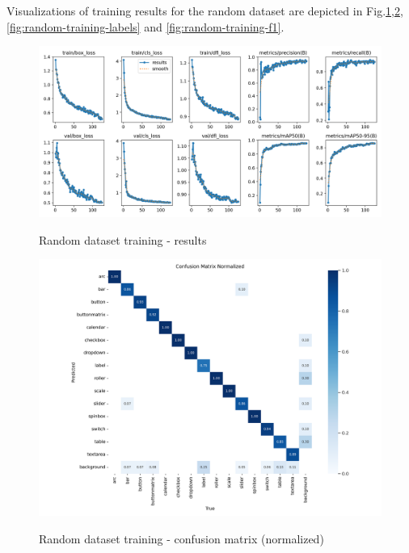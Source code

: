 \documentclass[Bachelor, BIC, english, fhCitStyle, IEEE]{BASE/twbook} %
\begin{document}
Visualizations of training results for the random dataset are depicted in Fig.\ref{fig:random-training-results},\ref{fig:random-training-confusion},\ref{fig:random-training-labels} and \ref{fig:random-training-f1}.\\
\begin{figure}
    \caption{Random dataset training - results}
    \centering
    \includegraphics[width=\textwidth]{PICs/train371/results.png}
    \label{fig:random-training-results}
\end{figure}
\begin{figure}
    \caption{Random dataset training - confusion matrix (normalized)}
    \centering
    \includegraphics[width=\textwidth]{PICs/train371/confusion_matrix_normalized.png}
    \label{fig:random-training-confusion}
\end{figure}
\end{document}
